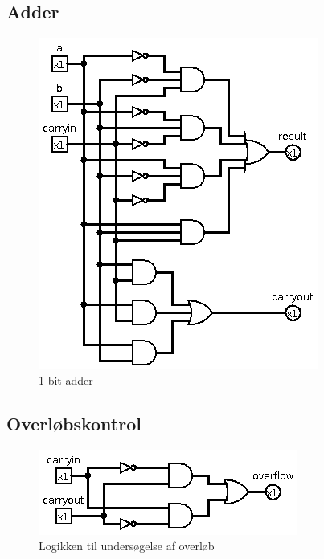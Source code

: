 \documentclass[10pt,a4paper,danish]{article}
\begin{document}
\subsection{Adder}
\begin{figure}[htb]
\begin{center}
\leavevmode
\includegraphics[scale=0.70]{adder-1bit.png}
\end{center}
\caption{1-bit adder}
\label{fig:adder}
\end{figure}

\subsection{Overløbskontrol}
\begin{figure}[htb]
\begin{center}
\leavevmode
\includegraphics[scale=0.70]{overflow-detection.png}
\end{center}
\caption{Logikken til undersøgelse af overløb}
\label{fig:overflow}
\end{figure}
\end{document}
